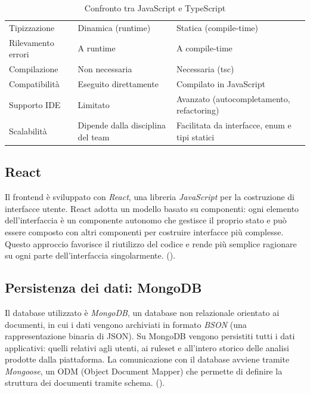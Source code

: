 \begin{table}[h]
\centering
\begin{tabular}{|L{4cm}|L{4cm}|L{4cm}|}
\hline
{}
 &  &  \\
\hline
Tipizzazione & Dinamica (runtime) & Statica (compile-time) \\
\hline
Rilevamento errori & A runtime & A compile-time \\
\hline
Compilazione & Non necessaria & Necessaria (tsc) \\
\hline
Compatibilità & Eseguito direttamente & Compilato in JavaScript \\
\hline
Supporto IDE & Limitato & Avanzato (autocompletamento,  refactoring) \\
\hline
Scalabilità & Dipende dalla disciplina del team & Facilitata da interfacce, enum e tipi statici \\
\hline
\end{tabular}
\caption{Confronto tra JavaScript e TypeScript}
\label{tab:js-vs-ts}
\end{table}

\subsection{React}
Il frontend è sviluppato con \emph{React}, una libreria \emph{JavaScript} per la costruzione di interfacce utente. React adotta un modello basato su componenti: ogni elemento dell'interfaccia è un componente autonomo che gestisce il proprio stato e può essere composto con altri componenti per costruire interfacce più complesse. Questo approccio favorisce il riutilizzo del codice e rende più semplice ragionare su ogni parte dell'interfaccia singolarmente. (\cite{site:react}).

\subsection{Persistenza dei dati: MongoDB}
Il database utilizzato è \emph{MongoDB}, un database non relazionale orientato ai documenti, in cui i dati vengono archiviati in formato \emph{BSON} (una rappresentazione binaria di JSON). Su MongoDB vengono persistiti tutti i dati applicativi: quelli relativi agli utenti, ai ruleset e all'intero storico delle analisi prodotte dalla piattaforma. La comunicazione con il database avviene tramite \emph{Mongoose}, un ODM (Object Document Mapper) che permette di definire la struttura dei documenti tramite schema. (\cite{site:mongoDB}).

